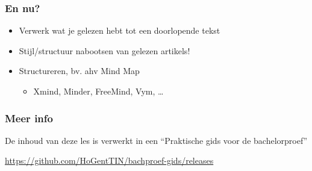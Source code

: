 \documentclass[aspectratio=169]{beamer}
\begin{document}
\begin{frame}
  \frametitle{En nu?}

  \begin{itemize}
    \item Verwerk wat je gelezen hebt tot een doorlopende tekst
    \item Stijl/structuur nabootsen van gelezen artikels!
    \item Structureren, bv. ahv Mind Map
      \begin{itemize}
        \item Xmind, Minder, FreeMind, Vym, \ldots
      \end{itemize}
  \end{itemize}
\end{frame}

\begin{frame}
  \frametitle{Meer info}

  De inhoud van deze les is verwerkt in een ``Praktische gids voor de bachelorproef''

  \vspace{12pt}

  \url{https://github.com/HoGentTIN/bachproef-gids/releases}

\end{frame}

\end{document}
